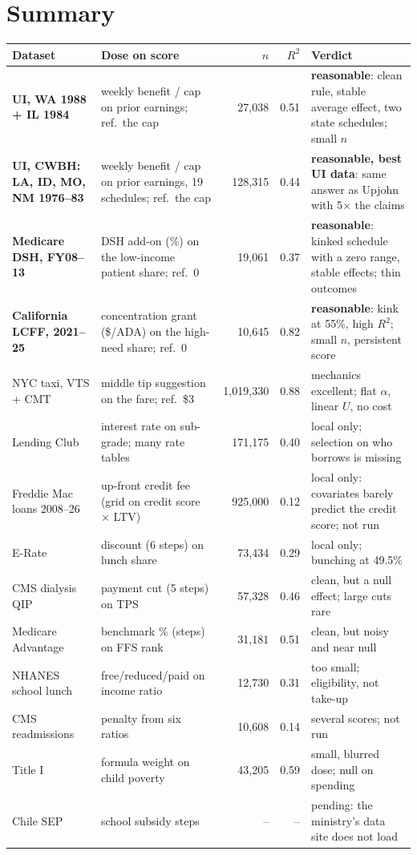 \documentclass[10pt]{article}
\begin{document}
\section*{Summary}

\small
\begin{tabular}{>{\raggedright}p{2.6cm}>{\raggedright}p{3.6cm}rr>{\raggedright}p{5.2cm}}
\toprule
Dataset & Dose on score & $n$ & $R^2$ & Verdict\tabularnewline
\midrule
\textbf{UI, WA 1988 + IL 1984} & weekly benefit / cap on prior earnings; ref.\ the cap & 27,038 & 0.51 & \textbf{reasonable}: clean rule, stable average effect, two state schedules; small $n$\tabularnewline
\textbf{UI, CWBH: LA, ID, MO, NM 1976--83} & weekly benefit / cap on prior earnings, 19 schedules; ref.\ the cap & 128,315 & 0.44 & \textbf{reasonable, best UI data}: same answer as Upjohn with 5$\times$ the claims\tabularnewline
\textbf{Medicare DSH, FY08--13} & DSH add-on (\%) on the low-income patient share; ref.\ 0 & 19,061 & 0.37 & \textbf{reasonable}: kinked schedule with a zero range, stable effects; thin outcomes\tabularnewline
\textbf{California LCFF, 2021--25} & concentration grant (\$/ADA) on the high-need share; ref.\ 0 & 10,645 & 0.82 & \textbf{reasonable}: kink at 55\%, high $R^2$; small $n$, persistent score\tabularnewline
NYC taxi, VTS + CMT & middle tip suggestion on the fare; ref.\ \$3 & 1,019,330 & 0.88 & mechanics excellent; flat $\alpha$, linear $U$, no cost\tabularnewline
Lending Club & interest rate on sub-grade; many rate tables & 171,175 & 0.40 & local only; selection on who borrows is missing\tabularnewline
Freddie Mac loans 2008--26 & up-front credit fee (grid on credit score $\times$ LTV) & 925,000 & 0.12 & local only: covariates barely predict the credit score; not run\tabularnewline
E-Rate & discount (6 steps) on lunch share & 73,434 & 0.29 & local only; bunching at 49.5\%\tabularnewline
CMS dialysis QIP & payment cut (5 steps) on TPS & 57,328 & 0.46 & clean, but a null effect; large cuts rare\tabularnewline
Medicare Advantage & benchmark \% (steps) on FFS rank & 31,181 & 0.51 & clean, but noisy and near null\tabularnewline
NHANES school lunch & free/reduced/paid on income ratio & 12,730 & 0.31 & too small; eligibility, not take-up\tabularnewline
CMS readmissions & penalty from six ratios & 10,608 & 0.14 & several scores; not run\tabularnewline
Title I & formula weight on child poverty & 43,205 & 0.59 & small, blurred dose; null on spending\tabularnewline
Chile SEP & school subsidy steps & -- & -- & pending: the ministry's data site does not load\tabularnewline
\bottomrule
\end{tabular}
\normalsize
\end{document}
